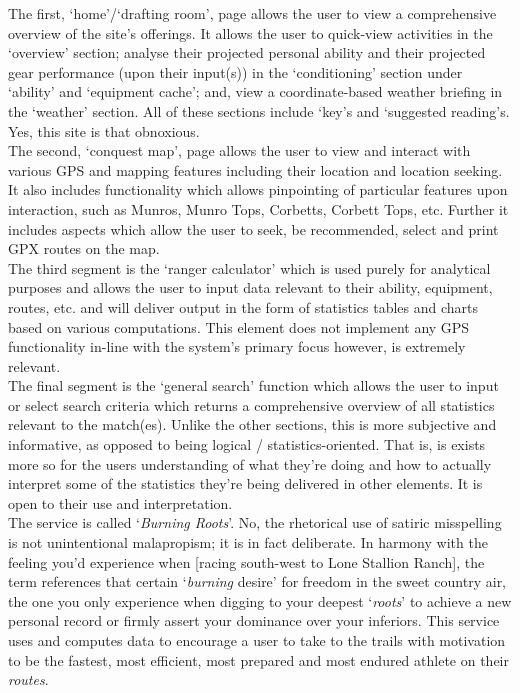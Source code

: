 \documentclass[11pt, english]{article}
\begin{document}
	The first, `home'/`drafting room', page allows the user to view a comprehensive overview of the site's offerings. It allows the user to quick-view activities in the `overview' section; analyse their projected personal ability and their projected gear performance (upon their input(s)) in the `conditioning' section under `ability' and `equipment cache'; and, view a coordinate-based weather briefing in the `weather' section. All of these sections include `key's and `suggested reading's. Yes, this site is that obnoxious.\\

	The second, `conquest map', page allows the user to view and interact with various GPS and mapping features including their location and location seeking. It also includes functionality which allows pinpointing of particular features upon interaction, such as Munros, Munro Tops, Corbetts, Corbett Tops, etc. Further it includes aspects which allow the user to seek, be recommended, select and print GPX routes on the map.\\

	The third segment is the `ranger calculator' which is used purely for analytical purposes and allows the user to input data relevant to their ability, equipment, routes, etc. and will deliver output in the form of statistics tables and charts based on various computations. This element does not implement any GPS functionality in-line with the system's primary focus however, is extremely relevant.\\

	The final segment is the `general search' function which allows the user to input or select search criteria which returns a comprehensive overview of all statistics relevant to the match(es). Unlike the other sections, this is more subjective and informative, as opposed to being logical / statistics-oriented. That is, is exists more so for the users understanding of what they're doing and how to actually interpret some of the statistics they're being delivered in other elements. It is open to their use and interpretation.\\

	The service is called `\textit{Burning Roots}'. No, the rhetorical use of satiric misspelling is not unintentional malapropism; it is in fact deliberate. In harmony with the feeling you'd experience when [racing south-west to Lone Stallion Ranch], the term references that certain `\textit{burning} desire' for freedom in the sweet country air, the one you only experience when digging to your deepest `\textit{roots}' to achieve a new personal record or firmly assert your dominance over your inferiors. This service uses and computes data to encourage a user to take to the trails with motivation to be the fastest, most efficient, most prepared and most endured athlete on their \textit{routes}.
\end{document}
